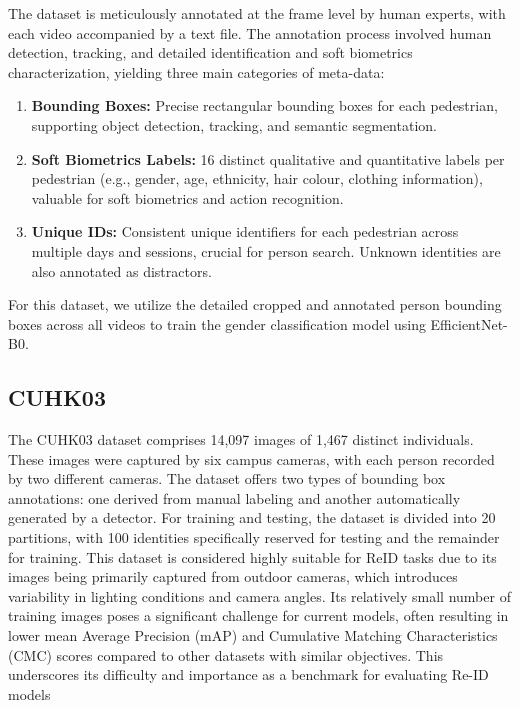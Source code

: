 The dataset is meticulously annotated at the frame level by human experts, with each video accompanied by a text file. The annotation process involved human detection, tracking, and detailed identification and soft biometrics characterization, yielding three main categories of meta-data:
\begin{enumerate}
\item \textbf{Bounding Boxes:} Precise rectangular bounding boxes for each pedestrian, supporting object detection, tracking, and semantic segmentation.
\item \textbf{Soft Biometrics Labels:} 16 distinct qualitative and quantitative labels per pedestrian (e.g., gender, age, ethnicity, hair colour, clothing information), valuable for soft biometrics and action recognition.
\item \textbf{Unique IDs:} Consistent unique identifiers for each pedestrian across multiple days and sessions, crucial for person search. Unknown identities are also annotated as distractors.
\end{enumerate}

For this dataset, we utilize the detailed cropped and annotated person bounding boxes across all videos to train the gender classification model using EfficientNet-B0.

\subsection{CUHK03}

The CUHK03 dataset \cite{cuhk03} comprises 14,097 images of 1,467 distinct individuals. These images were captured by six campus cameras, with each person recorded by two different cameras. The dataset offers two types of bounding box annotations: one derived from manual labeling and another automatically generated by a detector. For training and testing, the dataset is divided into 20 partitions, with 100 identities specifically reserved for testing and the remainder for training. This dataset is considered highly suitable for ReID tasks due to its images being primarily captured from outdoor cameras, which introduces variability in lighting conditions and camera angles. Its relatively small number of training images poses a significant challenge for current models, often resulting in lower mean Average Precision (mAP) and Cumulative Matching Characteristics (CMC) scores compared to other datasets with similar objectives. This underscores its difficulty and importance as a benchmark for evaluating Re-ID models

